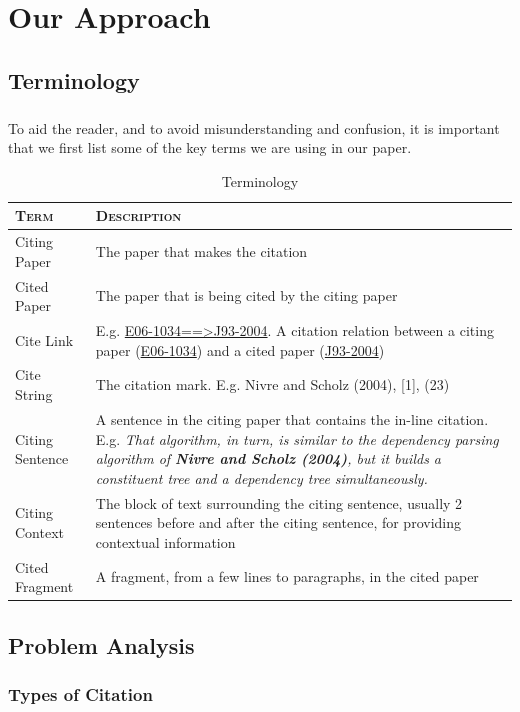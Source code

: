 \chapter{Our Approach}
\label{approach}
\section{Terminology}
\paragraph{}
To aid the reader, and to avoid misunderstanding and confusion, it is important that we first list some of the key terms we are using in our paper.
\begin{table}[h]
	\center
	\begin{tabular}{ l p{13cm}}
		\textsc{Term} & \textsc{Description}\\
		\hline
		Citing Paper & The paper that makes the citation \\
		Cited Paper & The paper that is being cited by the citing paper \\
		Cite Link & E.g. \url{E06-1034==>J93-2004}. A citation relation between a citing paper (\url{E06-1034}) and a cited paper (\url{J93-2004}) \\
		Cite String & The citation mark. E.g. Nivre and Scholz (2004), [1], (23) \\
		Citing Sentence & A sentence in the citing paper that contains the in-line citation. E.g. \textit{That algorithm, in turn, is similar to the dependency parsing algorithm of \textbf{Nivre and Scholz (2004)}, but it builds a constituent tree and a dependency tree simultaneously.} \\
		Citing Context & The block of text surrounding the citing sentence, usually 2 sentences before and after the citing sentence, for providing contextual information \\
		Cited Fragment & A fragment, from a few lines to paragraphs, in the cited paper
	\end{tabular}
	\caption{Terminology}
	\label{tab:terminology}
\end{table}

\section{Problem Analysis}
\subsection{Types of Citation}
